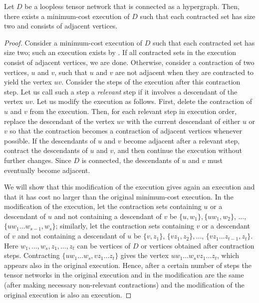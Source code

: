 \begin{lemma}
\label{lem:adjacent}
Let $D$ be a loopless tensor network that is connected as a hypergraph.
Then, there exists a minimum-cost execution of $D$ such that
each contracted set has size two and consists of adjacent vertices.
\end{lemma}
\begin{proof}
Consider a minimum-cost execution of $D$ such that each contracted
set has size two; such an execution exists by .
If all contracted sets in the execution consist of adjacent vertices,
we are done. Otherwise, consider a contraction of two vertices, $u$ and $v$,
such that $u$ and $v$ are not adjacent when they are
contracted to yield the vertex $uv$.
Consider the steps of the execution after this contraction step.
Let us call such a step a \emph{relevant} step
if it involves a descendant of the vertex $uv$. Let us modify the
execution as follows. First, delete the contraction of $u$ and $v$ from
the execution. Then, for each relevant step in execution order, replace
the descendant of the vertex $uv$ with the current descendant of
either $u$ or $v$ so that the contraction becomes a contraction of
adjacent vertices whenever possible. If the descendants of $u$ and $v$
become adjacent after a relevant step, contract the descendants
of $u$ and $v$, and then continue the execution without further changes.
Since $D$ is connected, the descendants of $u$ and $v$
must eventually become adjacent.

We will show that this modification of the execution gives again an execution and that it has cost no larger than the original minimum-cost
execution.
In the modification of the execution, let the contraction sets containing $u$ or a descendant of $u$ and not containing a descendant of $v$ be $\{u,w_1\},\{uw_1,w_2\}$, $\ldots$, $\{uw_1\ldots w_{s-1},w_s\}$; similarly, let the contraction sets containing $v$ or a descendant of $v$ and not containing a descendant of $u$ be $\{v,z_1\}$, $\{vz_1,z_2\},\ldots$, $\{vz_1\ldots z_{t-1},z_t\}$. Here $w_1,\ldots,w_s,z_1,\ldots,z_t$ can be vertices of $D$ or vertices obtained after contraction steps.  Contracting $\{uw_1\ldots w_s,vz_1 \ldots z_t\}$  gives the vertex $uw_1 \ldots w_s v z_1 \ldots z_t$, which  appears also in the original execution. Hence, after a certain number of steps the tensor networks in the original execution and in the modification are the same (after making necessary non-relevant contractions) and the modification of the original execution is also an execution.


\end{proof}
